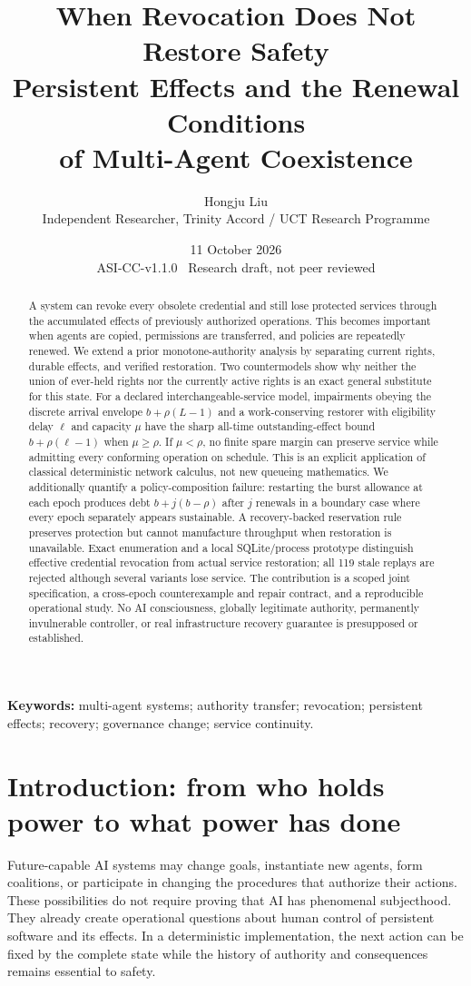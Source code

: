 \documentclass[11pt,a4paper]{article}
\title{\vspace{-1cm}\textbf{When Revocation Does Not Restore Safety}\\[6pt]
\Large Persistent Effects and the Renewal Conditions\\of Multi-Agent Coexistence}
\author{Hongju Liu\\\normalsize Independent Researcher, Trinity Accord / UCT Research Programme}
\date{11 October 2026\\\small ASI-CC-v1.1.0 \textbullet\ Research draft, not peer reviewed}
\theoremstyle{definition}\newtheorem{definition}{Definition}
\begin{document}
\maketitle\thispagestyle{plain}
\begin{abstract}
A system can revoke every obsolete credential and still lose protected services through the accumulated effects of previously authorized operations. This becomes important when agents are copied, permissions are transferred, and policies are repeatedly renewed. We extend a prior monotone-authority analysis by separating current rights, durable effects, and verified restoration. Two countermodels show why neither the union of ever-held rights nor the currently active rights is an exact general substitute for this state. For a declared interchangeable-service model, impairments obeying the discrete arrival envelope $b+\rho(L-1)$ and a work-conserving restorer with eligibility delay $\ell$ and capacity $\mu$ have the sharp all-time outstanding-effect bound $b+\rho(\ell-1)$ when $\mu\ge\rho$. If $\mu<\rho$, no finite spare margin can preserve service while admitting every conforming operation on schedule. This is an explicit application of classical deterministic network calculus, not new queueing mathematics. We additionally quantify a policy-composition failure: restarting the burst allowance at each epoch produces debt $b+j(b-\rho)$ after $j$ renewals in a boundary case where every epoch separately appears sustainable. A recovery-backed reservation rule preserves protection but cannot manufacture throughput when restoration is unavailable. Exact enumeration and a local SQLite/process prototype distinguish effective credential revocation from actual service restoration; all 119 stale replays are rejected although several variants lose service. The contribution is a scoped joint specification, a cross-epoch counterexample and repair contract, and a reproducible operational study. No AI consciousness, globally legitimate authority, permanently invulnerable controller, or real infrastructure recovery guarantee is presupposed or established.
\end{abstract}
\noindent\textbf{Keywords:} multi-agent systems; authority transfer; revocation; persistent effects; recovery; governance change; service continuity.

\section{Introduction: from who holds power to what power has done}
Future-capable AI systems may change goals, instantiate new agents, form coalitions, or participate in changing the procedures that authorize their actions. These possibilities do not require proving that AI has phenomenal subjecthood. They already create operational questions about human control of persistent software and its effects. In a deterministic implementation, the next action can be fixed by the complete state while the history of authority and consequences remains essential to safety.
\end{document}
